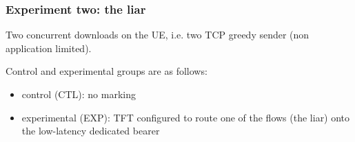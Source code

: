 \begin{frame}
\frametitle{Experiment two: the liar}

Two concurrent downloads on the UE, i.e. two TCP greedy sender (non application limited).
\vspace{.5cm}

Control and experimental groups are as follows:
\begin{itemize}
\item control (CTL): no marking
\item experimental (EXP): TFT configured to route one of the flows (the liar) onto the low-latency dedicated bearer
\end{itemize}

\end{frame}
